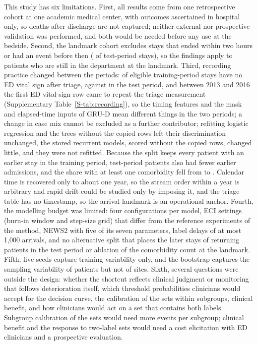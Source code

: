 This study has six limitations. First, all results come from one retrospective cohort at one academic medical center, with outcomes ascertained in hospital only, so
deaths after discharge are not captured; neither external nor prospective validation was performed, and both would be needed before any use at the bedside. Second, the
landmark cohort excludes stays that ended within two hours or had an event before then (\RVHtwoTestIneligiblePct{} of test-period stays), so the findings apply to
patients who are still in the department at the landmark. Third, recording practice changed between the periods: \RVZeroRowsTrainPct{} of eligible training-period stays
have no ED vital sign after triage, against \RVZeroRowsTestPct{} in the test period, and between 2013 and 2016 the first ED vital-sign row came to repeat the triage measurement (Supplementary Table~\ref{S-tab:recording}), so the timing features and the mask and elapsed-time inputs of GRU-D mean different things in the two periods; a change in case mix cannot be excluded as a further contributor; refitting logistic regression and the trees without the copied rows left their discrimination unchanged, the stored recurrent models, scored without the copied rows, changed little, and they were not refitted. Because the split keeps every patient with an earlier stay in the training period, test-period patients also had fewer earlier admissions, and the share with at least one comorbidity fell from \RVCharTrainElixPct{} to \RVCharTestElixPct{}. Calendar time is
recovered only to about one year, so the stream order within a year is arbitrary and rapid drift could be studied only by imposing it, and the triage table has no
timestamp, so the arrival landmark is an operational anchor. Fourth, the modelling budget was limited: four configurations per model, ECI settings (burn-in window and
step-size grid) that differ from the reference experiments of the method, NEWS2 with five of its seven parameters, label delays of at most 1{,}000 arrivals, and no alternative split that places the later stays of returning patients in the test period or ablation of the comorbidity count at the landmark. Fifth,
five seeds capture training variability only, and the bootstrap captures the sampling variability of patients but not of sites. Sixth, several questions were outside the
design: whether the shortcut reflects clinical judgment or monitoring that follows deterioration itself, which threshold probabilities clinicians would accept for the
decision curve, the calibration of the sets within subgroups, clinical benefit, and how clinicians would act on a set that contains both labels. Subgroup calibration of the sets would need more
events per subgroup; clinical benefit and the response to two-label sets would need a cost elicitation with ED clinicians and a prospective evaluation.
